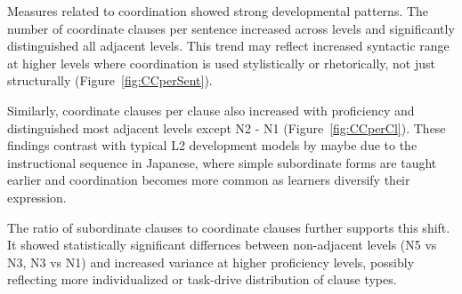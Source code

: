 
Measures related to coordination showed strong developmental patterns. The number of coordinate clauses per sentence
increased across levels and significantly
distinguished all adjacent levels. This trend may reflect increased syntactic range at higher levels where
coordination is used stylistically or rhetorically, not just structurally (Figure~\ref{fig:CCperSent}).

Similarly, coordinate clauses per clause also increased with proficiency and distinguished most adjacent levels
except N2 - N1 (Figure~\ref{fig:CCperCl}). These findings contrast with typical L2 development models by maybe due
to the instructional sequence in Japanese, where simple subordinate forms are taught earlier and coordination
becomes more common as learners diversify their expression.

The ratio of subordinate clauses to
coordinate clauses further supports this shift. It showed statistically significant differnces between non-adjacent
levels (N5 vs N3, N3 vs N1) and increased variance at higher proficiency levels, possibly reflecting more
individualized or task-drive distribution of clause types.

